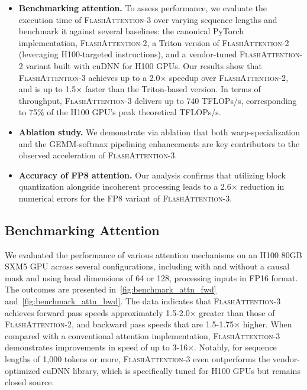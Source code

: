 \begin{algorithm}[H]
\begin{algorithmic}[1]
\begin{itemize}

\item \textbf{Benchmarking attention.} To assess performance, we evaluate the execution time of \textsc{FlashAttention-3} over varying sequence lengths and benchmark it against several baselines: the canonical PyTorch implementation, \textsc{FlashAttention-2}, a Triton version of \textsc{FlashAttention-2} (leveraging H100-targeted instructions), and a vendor-tuned \textsc{FlashAttention-2} variant built with cuDNN for H100 GPUs. Our results show that \textsc{FlashAttention-3} achieves up to a 2.0$\times$ speedup over \textsc{FlashAttention-2}, and is up to 1.5$\times$ faster than the Triton-based version. In terms of throughput, \textsc{FlashAttention-3} delivers up to 740 TFLOPs/s, corresponding to 75\% of the H100 GPU’s peak theoretical TFLOPs/s.
\item \textbf{Ablation study.} We demonstrate via ablation that both warp-specialization and the GEMM-softmax pipelining enhancements are key contributors to the observed acceleration of \textsc{FlashAttention-3}.
\item \textbf{Accuracy of FP8 attention.} Our analysis confirms that utilizing block quantization alongside incoherent processing leads to a 2.6$\times$ reduction in numerical errors for the FP8 variant of \textsc{FlashAttention-3}.
\end{itemize}

\subsection{Benchmarking Attention}
\label{subsec:benchmark_attn}

We evaluated the performance of various attention mechanisms on an H100 80GB SXM5 GPU across several configurations, including with and without a causal mask and using head dimensions of 64 or 128, processing inputs in FP16 format. The outcomes are presented in~\cref{fig:benchmark_attn_fwd} and~\cref{fig:benchmark_attn_bwd}. The data indicates that \textsc{FlashAttention-3} achieves forward pass speeds approximately 1.5-2.0$\times$ greater than those of \textsc{FlashAttention-2}, and backward pass speeds that are 1.5-1.75$\times$ higher. When compared with a conventional attention implementation, \textsc{FlashAttention-3} demonstrates improvements in speed of up to 3-16$\times$. Notably, for sequence lengths of 1,000 tokens or more, \textsc{FlashAttention-3} even outperforms the vendor-optimized cuDNN library, which is specifically tuned for H100 GPUs but remains closed source.


\end{algorithmic}
\end{algorithm}
